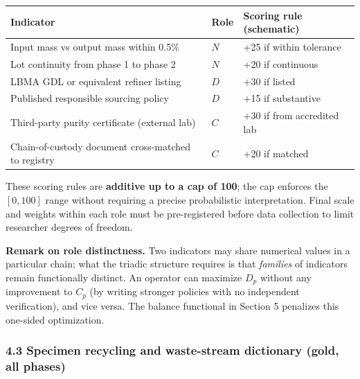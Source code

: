 \documentclass[
  11pt,
  letterpaper,
]{article}
\begin{document}
\begin{longtable}[]{@{}
  >{\raggedright\arraybackslash}p{}
  >{\raggedright\arraybackslash}p{}
  >{\raggedright\arraybackslash}p{}@{}}
\toprule\noalign{}
\begin{minipage}[b]{\linewidth}\raggedright
Indicator
\end{minipage} & \begin{minipage}[b]{\linewidth}\raggedright
Role
\end{minipage} & \begin{minipage}[b]{\linewidth}\raggedright
Scoring rule (schematic)
\end{minipage} \\
\midrule\noalign{}
\endhead
\bottomrule\noalign{}
\endlastfoot
Input mass vs output mass within 0.5\% & \(N\) & +25 if within
tolerance \\
Lot continuity from phase 1 to phase 2 & \(N\) & +20 if continuous \\
LBMA GDL or equivalent refiner listing & \(D\) & +30 if listed \\
Published responsible sourcing policy & \(D\) & +15 if substantive \\
Third-party purity certificate (external lab) & \(C\) & +30 if from
accredited lab \\
Chain-of-custody document cross-matched to registry & \(C\) & +20 if
matched \\
\end{longtable}

These scoring rules are \textbf{additive up to a cap of 100}; the cap
enforces the \([0,100]\) range without requiring a precise probabilistic
interpretation. Final scale and weights within each role must be
pre-registered before data collection to limit researcher degrees of
freedom.

\textbf{Remark on role distinctness.} Two indicators may share numerical
values in a particular chain; what the triadic structure requires is
that \emph{families} of indicators remain functionally distinct. An
operator can maximize \(D_p\) without any improvement to \(C_p\) (by
writing stronger policies with no independent verification), and vice
versa. The balance functional in Section 5 penalizes this one-sided
optimization.

\subsubsection{4.3 Specimen recycling and waste-stream dictionary (gold,
all
phases)}\label{specimen-recycling-and-waste-stream-dictionary-gold-all-phases}
\end{document}
